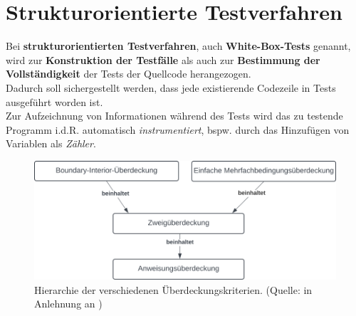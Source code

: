 \section{Strukturorientierte Testverfahren}

\begin{tcolorbox}[title=Strukturorientierte Testverfahren]
    Bei \textbf{strukturorientierten Testverfahren}, auch \textbf{White-Box-Tests} genannt, wird zur \textbf{Konstruktion der Testfälle} als auch zur \textbf{Bestimmung der Vollständigkeit} der Tests der Quellcode herangezogen.\\
    Dadurch soll sichergestellt werden, dass jede existierende Codezeile in Tests ausgeführt worden ist.\\

    \noindent
    Zur Aufzeichnung von Informationen während des Tests wird das zu testende Programm i.d.R. automatisch \textit{instrumentiert}, bspw. durch das Hinzufügen von Variablen als \textit{Zähler}.
\end{tcolorbox}



\begin{figure}
    \centering
    \includegraphics[scale=0.4]{part four/Testende Verfahren/img/coverage-criteria-hierarchy}
    \caption{Hierarchie der verschiedenen Überdeckungskriterien. (Quelle: in Anlehnung an \cite[Abb. 5.2, 53]{Wed09c})}
    \label{fig:coverage-criteria-hierarchy-cc}
\end{figure}
